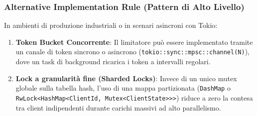 \documentclass[11pt,a4paper]{article}
\begin{document}
\subsubsection*{Alternative Implementation Rule (Pattern di Alto Livello)}
In ambienti di produzione industriali o in scenari asincroni con Tokio:
\begin{enumerate}[leftmargin=1.5em]
    \item \textbf{Token Bucket Concorrente}: Il limitatore può essere implementato tramite un canale di token sincrono o asincrono (\texttt{tokio::sync::mpsc::channel(N)}), dove un task di background ricarica i token a intervalli regolari.
    \item \textbf{Lock a granularità fine (Sharded Locks)}: Invece di un unico mutex globale sulla tabella hash, l'uso di una mappa partizionata (\texttt{DashMap} o \texttt{RwLock<HashMap<ClientId, Mutex<ClientState>>>}) riduce a zero la contesa tra client indipendenti durante carichi massivi ad alto parallelismo.
\end{enumerate}
\end{document}
